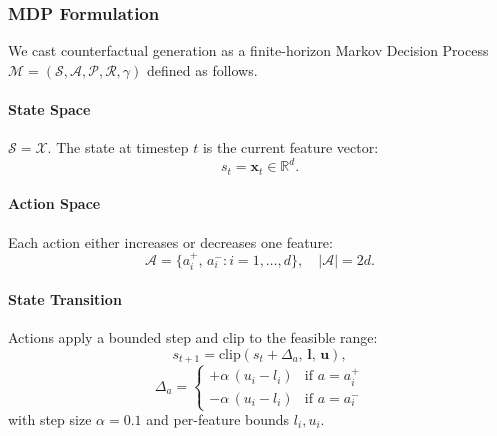 \documentclass[conference]{IEEEtran}
\newcommand{\R}{\mathbb{R}}
\newcommand{\Xspace}{\mathcal{X}}
\newcommand{\bx}{\mathbf{x}}
\newcommand{\bl}{\mathbf{l}}
\newcommand{\bu}{\mathbf{u}}
\begin{document}
\subsubsection{MDP Formulation}

We cast counterfactual generation as a finite-horizon Markov Decision Process
$\mathcal{M} = (\mathcal{S}, \mathcal{A}, \mathcal{P}, \mathcal{R}, \gamma)$
defined as follows.

\paragraph{State Space} $\mathcal{S} = \Xspace$. The state at timestep $t$ is
the current feature vector:
\begin{equation}
s_t = \bx_t \in \R^d.
\label{eq:state}
\end{equation}

\paragraph{Action Space} Each action either increases or decreases one feature:
\begin{equation}
\mathcal{A} = \{a_i^+,\, a_i^- : i = 1,\ldots,d\},
  \quad |\mathcal{A}| = 2d.
\label{eq:action_space}
\end{equation}

\paragraph{State Transition} Actions apply a bounded step and clip to the
feasible range:
\begin{equation}
s_{t+1} = \text{clip}(s_t + \Delta_a,\, \bl,\, \bu),
\label{eq:transition}
\end{equation}
\begin{equation}
\Delta_a = \begin{cases}
  +\alpha\,(u_i - l_i) & \text{if } a = a_i^+ \\
  -\alpha\,(u_i - l_i) & \text{if } a = a_i^-
\end{cases}
\label{eq:delta}
\end{equation}
with step size $\alpha = 0.1$ and per-feature bounds $l_i, u_i$.
\end{document}
